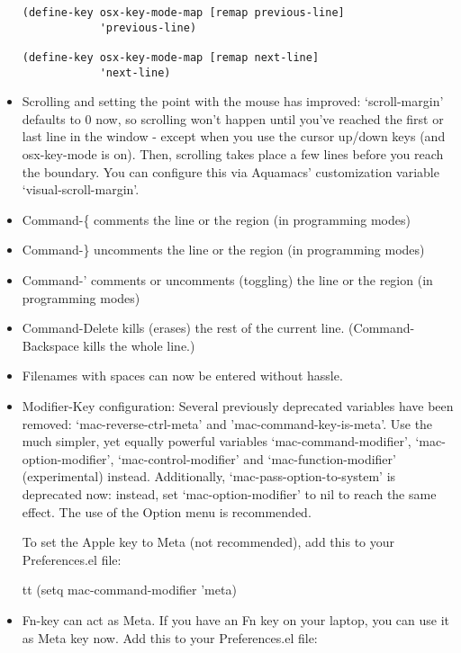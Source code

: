 \begin{itemize}
\begin{verbatim}
(define-key osx-key-mode-map [remap previous-line]
            'previous-line)

(define-key osx-key-mode-map [remap next-line]
            'next-line)
\end{verbatim}

\item Scrolling and setting the point with the mouse has improved:
        `scroll-margin' defaults to 0 now, so scrolling won't happen until
        you've reached the first or last line in the window - except when
        you use the cursor up/down keys (and osx-key-mode is on). Then,
        scrolling takes place a few lines before you reach the
        boundary. You can configure this via Aquamacs' customization
        variable `visual-scroll-margin'.

\item Command-\{ comments the line or the region (in programming modes)
\item Command-\} uncomments the line or the region (in programming
        modes)
\item Command-' comments or uncomments (toggling) the line or
        the region (in programming modes)

\item Command-Delete kills (erases) the rest of the current
        line. (Command-Backspace kills the whole line.)

\item Filenames with spaces can now be entered without hassle.

\item Modifier-Key configuration: Several previously deprecated
        variables have been removed: `mac-reverse-ctrl-meta' and
        'mac-command-key-is-meta'. Use the much simpler, yet
        equally powerful variables `mac-command-modifier',
        `mac-option-modifier', `mac-control-modifier' and
        `mac-function-modifier' (experimental) instead.
        Additionally, `mac-pass-option-to-system' is deprecated now:
        instead, set `mac-option-modifier' to nil to reach the same
        effect. The use of the Option menu is recommended.

        To set the Apple key to Meta (not recommended), add this to your
        Preferences.el file:

        {tt (setq mac-command-modifier 'meta)}

\item Fn-key can act as Meta. If you have an Fn key on your laptop,
        you can use it as Meta key now. Add this to your Preferences.el
        file:


\end{itemize}
